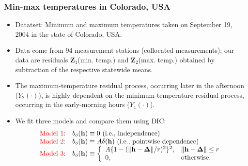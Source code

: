 \documentclass{beamer}
\newcommand{\Deltab} {\boldsymbol{\Delta}}
\newcommand{\h}{\mathbf{h}}
\begin{document}
\begin{frame}
\frametitle{Min-max temperatures in Colorado, USA}

\begin{itemize}
\item Datatset: Minimum and maximum temperatures taken on September 19, 2004 in the state of Colorado, USA.
\item Data come from 94 measurement stations (collocated measurements); our data are residuals $\mathbf{Z}_1$(min. temp.) and $\mathbf{Z}_2$(max. temp.) obtained by subtraction of the respective statewide means.
\item The maximum\hyp{}temperature residual process, occurring later in the afternoon ($Y_2(\cdot)$), is highly dependent on the minimum\hyp{}temperature residual process, occurring in the early-morning hours ($Y_1(\cdot)$).
\item We fit three models and compare them using DIC:
\begin{equation*}
\begin{array}{ll}
\textrm{\textcolor{red}{Model 1}:} &b_o(\h) \equiv 0 \mbox{ (i.e., independence)}\\
\textrm{\textcolor{red}{Model 2}:} &b_o(\h) \equiv A\delta(\h) \mbox{ (i.e., pointwise dependence)}\\
\textrm{\textcolor{red}{Model 3}:} &b_o(\h) \equiv \left\{\begin{array}{ll} A\{1 - (\|\h - \Deltab\|/r)^2\}^2, & \| \h - \Deltab\| \le r \\ 0, & \textrm{otherwise}. \end{array} \right.
\end{array}
\end{equation*}
\end{itemize}
\end{frame}

\end{document}
